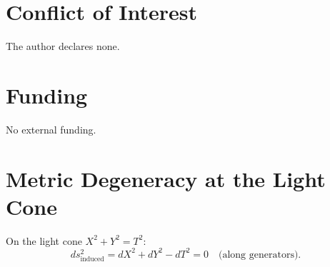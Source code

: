 \documentclass[10pt]{article}
\begin{document}
\section*{Conflict of Interest}
The author declares none.

\section*{Funding}
No external funding.

\appendix

\section{Metric Degeneracy at the Light Cone}
On the light cone $X^2 + Y^2 = T^2$:
\begin{equation*}
ds_{\text{induced}}^2 = dX^2 + dY^2 - dT^2 = 0 \quad \text{(along generators)}.
\end{equation*}
\end{document}
